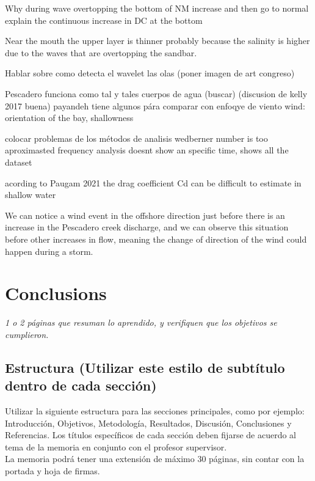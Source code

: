 \documentclass[11pt,letterpaper]{article}
\begin{document}
Why during wave overtopping the bottom of NM increase and then go to normal
explain the  continuous increase in DC at the bottom

Near the mouth the upper layer is thinner probably because the salinity is higher due to the waves that are overtopping the sandbar.

Hablar sobre como detecta el wavelet las olas (poner imagen de art congreso)

Pescadero funciona como tal y tales cuerpos de agua (buscar) (discusion de kelly 2017 buena)
payandeh tiene algunos pára comparar con enfoqye de viento
wind: orientation of the bay, shallowness

colocar problemas de los métodos de analisis
wedberner number is too aproximasted
frequency analysis doesnt show an specific time, shows all the dataset

acording to Paugam 2021 the drag coefficient Cd can be difficult to estimate in shallow water %

We can notice a wind event in the offshore direction just before there is an increase in the Pescadero creek discharge, and we can observe this situation before other increases in flow, meaning the change of direction of the wind could happen during a storm.

\section{Conclusions}

\textit{1 o 2 páginas que resuman lo aprendido, y verifiquen que los objetivos se cumplieron.}

\subsection{Estructura (Utilizar este estilo de subtítulo dentro de cada sección)}
Utilizar la siguiente estructura para las secciones principales, como por ejemplo: Introducción, Objetivos, Metodología, Resultados, Discusión, Conclusiones y Referencias. Los títulos específicos de cada sección deben fijarse de acuerdo al tema de la memoria en conjunto con el profesor supervisor.\\

La memoria podrá tener una extensión de máximo 30 páginas, sin contar con la portada y hoja de firmas.



\end{document}
